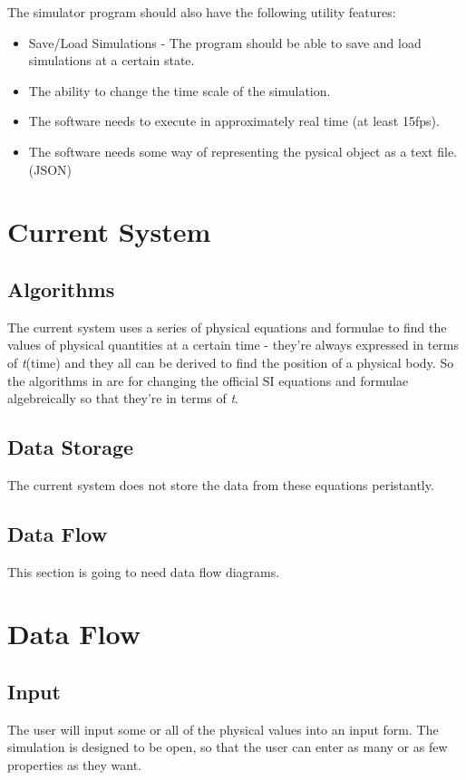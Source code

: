 The simulator program should also have the following utility features:
\begin{itemize}
	\item Save/Load Simulations - The program should be able to save and load simulations at a certain state.
	\item The ability to change the time scale of the simulation.
	\item The software needs to execute in approximately real time (at least 15fps).
	\item The software needs some way of representing the pysical object as a text file. (JSON)

\end{itemize}

\section{Current System}

	\subsection{Algorithms}
		The current system uses a series of physical equations and formulae to find the values of physical quantities at a certain time - they're always expressed in terms of \textit{t}(time) and they all can be derived to find the position of a physical body. So the algorithms in are for changing the official SI equations and formulae algebreically so that they're in terms of \textit{t}.

	\subsection{Data Storage}
		The current system does not store the data from these equations peristantly.

	\subsection{Data Flow}
		This section is going to need data flow diagrams.


\section{Data Flow}
\subsection{Input}
	The user will input some or all of the physical values into an input form. The simulation is designed to be open, so that the user can enter as many or as few properties as they want.

